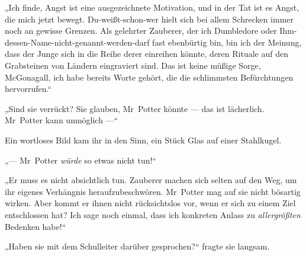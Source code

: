 „Ich finde, Angst ist eine ausgezeichnete Motivation, und in der Tat ist es Angst, die mich jetzt bewegt. Du-weißt-schon-wer hielt sich bei allem Schrecken immer noch an gewisse Grenzen. Als gelehrter Zauberer, der ich Dumbledore oder Ihm-dessen-Name-nicht-genannt-werden-darf fast ebenbürtig bin, bin ich der Meinung, dass der Junge sich in die Reihe derer einreihen könnte, deren Rituale auf den Grabsteinen von Ländern eingraviert sind. Das ist keine müßige Sorge, McGonagall, ich habe bereits Worte gehört, die die schlimmsten Befürchtungen hervorrufen.“

„Sind sie verrückt? Sie glauben, Mr~Potter könnte — das ist lächerlich. Mr~Potter kann unmöglich —“

Ein wortloses Bild kam ihr in den Sinn, ein Stück Glas auf einer Stahlkugel.

„— Mr~Potter \emph{würde} so etwas nicht tun!“

„Er muss es nicht absichtlich tun. Zauberer machen sich selten auf den Weg, um ihr eigenes Verhängnis heraufzubeschwören. Mr~Potter mag auf sie nicht bösartig wirken. Aber kommt er ihnen nicht rücksichtslos vor, wenn er sich zu einem Ziel entschlossen hat? Ich sage noch einmal, dass ich konkreten Anlass zu \emph{allergrößten} Bedenken habe!“

„Haben sie mit dem Schulleiter darüber gesprochen?“ fragte sie langsam.


